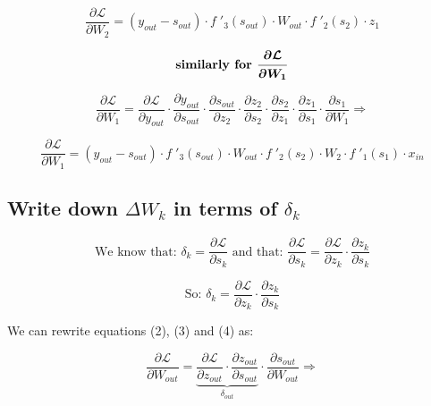 \documentclass[a4paper]{article}
\begin{document}
\begin{equation}
\frac{\partial \mathcal{L}}{\partial W_{2}} = (y_{out} - s_{out}) \cdot  f\;'_{3}(s_{out}) \cdot W_{out} \cdot f\;'_{2}(s_{2}) \cdot z_1 
\nonumber \end{equation}

\begin{equation} \mbox{\textbf{similarly for }}  \boldsymbol{\frac{\partial \mathcal{L}}{\partial W_{1}} \nonumber} \end{equation}

\begin{equation}
\frac{\partial \mathcal{L}}{\partial W_{1}} = \frac{\partial \mathcal{L}}{\partial y_{out}} \cdot \frac{\partial y_{out}}{\partial s_{out}} \cdot \frac{\partial s_{out}}{\partial z_{2}} \cdot \frac{\partial z_{2}}{\partial s_{2}} \cdot \frac{\partial s_{2}}{\partial z_{1}} \cdot \frac{\partial z_{1}}{\partial s_{1}} \cdot \frac{\partial s_{1}}{\partial W_{1}} \Rightarrow
\end{equation}

\begin{equation}
\frac{\partial \mathcal{L}}{\partial W_{1}} = (y_{out} - s_{out}) \cdot  f\;'_{3}(s_{out}) \cdot W_{out} \cdot f\;'_{2}(s_{2}) \cdot W_{2} \cdot f\;'_{1}(s_{1}) \cdot x_{in}
\nonumber \end{equation}

\subsection{Write down \texorpdfstring{$\Delta W_k$}{TEXT} in terms of \texorpdfstring{$\delta_k$}{TEXT}}

\begin{equation}
\mbox{{We know that: }}
\delta_k = \frac{\partial \mathcal{L}}{\partial s_{k}}
\mbox{{ and that: }}
\frac{\partial \mathcal{L}}{\partial s_{k}} = \frac{\partial \mathcal{L}}{\partial z_{k}} \cdot \frac{\partial z_k}{\partial s_{k}}
\nonumber \end{equation}

\begin{equation}
\mbox{{So: }}
\delta_k = \frac{\partial \mathcal{L}}{\partial z_{k}} \cdot \frac{\partial z_k}{\partial s_{k}}
\end{equation}

We can rewrite equations (2), (3) and (4) as:

\begin{equation}
\frac{\partial \mathcal{L}}{\partial W_{out}} = \underbrace {\frac{\partial \mathcal{L}}{\partial z_{out}} \cdot \frac{\partial z_{out}}{\partial s_{out}}}_{\delta_{out}} \cdot \frac{\partial s_{out}}{\partial W_{out}} \Rightarrow
\nonumber \end{equation}
\end{document}
